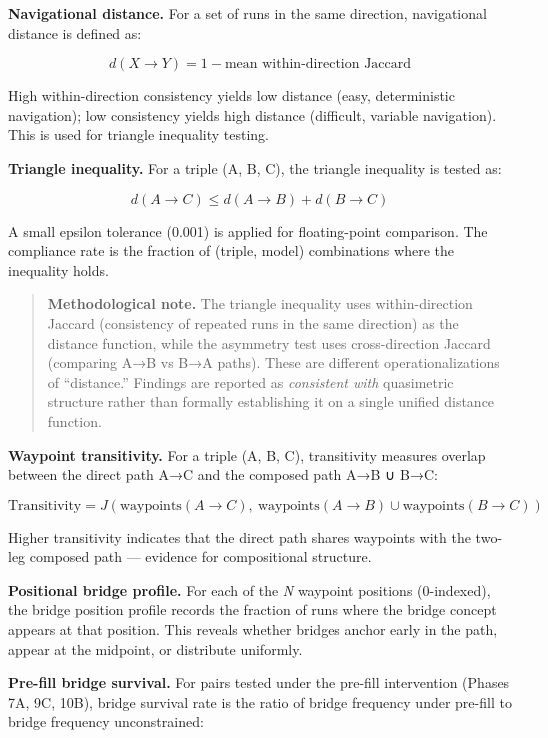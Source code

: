 \textbf{Navigational distance.} For a set of runs in the same direction, navigational distance is defined as:

\[d(X \to Y) = 1 - \text{mean within-direction Jaccard}\]

High within-direction consistency yields low distance (easy, deterministic navigation); low consistency yields high distance (difficult, variable navigation). This is used for triangle inequality testing.

\textbf{Triangle inequality.} For a triple (A, B, C), the triangle inequality is tested as:

\[d(A \to C) \leq d(A \to B) + d(B \to C)\]

A small epsilon tolerance (0.001) is applied for floating-point comparison. The compliance rate is the fraction of (triple, model) combinations where the inequality holds.

\begin{quote}
\textbf{Methodological note.} The triangle inequality uses within-direction Jaccard (consistency of repeated runs in the same direction) as the distance function, while the asymmetry test uses cross-direction Jaccard (comparing A→B vs B→A paths). These are different operationalizations of ``distance.'' Findings are reported as \emph{consistent with} quasimetric structure rather than formally establishing it on a single unified distance function.
\end{quote}

\textbf{Waypoint transitivity.} For a triple (A, B, C), transitivity measures overlap between the direct path A→C and the composed path A→B ∪ B→C:

\[\text{Transitivity} = J(\text{waypoints}(A \to C),\ \text{waypoints}(A \to B) \cup \text{waypoints}(B \to C))\]

Higher transitivity indicates that the direct path shares waypoints with the two-leg composed path --- evidence for compositional structure.

\textbf{Positional bridge profile.} For each of the \emph{N} waypoint positions (0-indexed), the bridge position profile records the fraction of runs where the bridge concept appears at that position. This reveals whether bridges anchor early in the path, appear at the midpoint, or distribute uniformly.

\textbf{Pre-fill bridge survival.} For pairs tested under the pre-fill intervention (Phases 7A, 9C, 10B), bridge survival rate is the ratio of bridge frequency under pre-fill to bridge frequency unconstrained:

